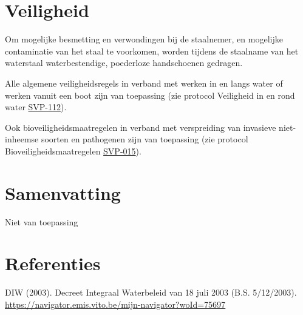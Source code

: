 \documentclass[
]{scrreprt}
\begin{document}
\hypertarget{veiligheid}{%
\chapter{Veiligheid}\label{veiligheid}}

Om mogelijke besmetting en verwondingen bij de staalnemer, en mogelijke contaminatie van het staal te voorkomen, worden tijdens de staalname van het waterstaal waterbestendige, poederloze handschoenen gedragen.

Alle algemene veiligheidsregels in verband met werken in en langs water of werken vanuit een boot zijn van toepassing (zie protocol Veiligheid in en rond water \href{}{SVP-112}).

Ook bioveiligheidsmaatregelen in verband met verspreiding van invasieve niet-inheemse soorten en pathogenen zijn van toepassing (zie protocol Bioveiligheidsmaatregelen \href{}{SVP-015}).

\hypertarget{samenvatting}{%
\chapter{Samenvatting}\label{samenvatting}}

Niet van toepassing

\hypertarget{referenties}{%
\chapter*{Referenties}\label{referenties}}

DIW (2003).
Decreet Integraal Waterbeleid van 18 juli 2003 (B.S. 5/12/2003).
\href{https://navigator.emis.vito.be/mijn-navigator?woId=75697}{\ul{https://navigator.emis.vito.be/mijn-navigator?woId=75697}}

\hypertarget{appendix-bijlagen}{%
\appendix}
\end{document}
